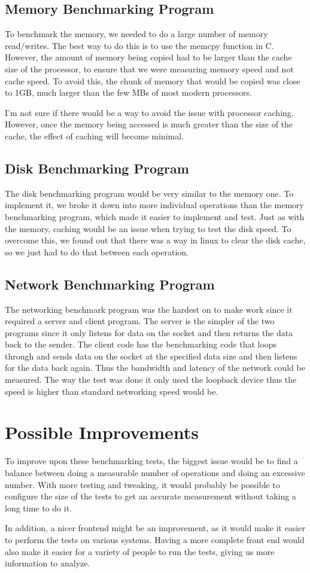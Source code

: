 \documentclass{article}
\begin{document}
\subsection{Memory Benchmarking Program}
To benchmark the memory, we needed to do a large number of memory read/writes.  The best way to do this is to use the memcpy function in C.  However, the amount of memory being copied had to be larger than the cache size of the processor, to ensure that we were measuring memory speed and not cache speed.  To avoid this, the chunk of memory that would be copied was close to 1GB, much larger than the few MBs of most modern processors.

I'm not sure if there would be a way to avoid the issue with processor caching.  However, once the memory being accessed is much greater than the size of the cache, the effect of caching will become minimal.

\subsection{Disk Benchmarking Program}
The disk benchmarking program would be very similar to the memory one.  To implement it, we broke it down into more individual operations than the memory benchmarking program, which made it easier to implement and test.  Just as with the memory, caching would be an issue when trying to test the disk speed.  To overcome this, we found out that there was a way in linux to clear the disk cache, so we just had to do that between each operation.

\subsection{Network Benchmarking Program}
The networking benchmark program was the hardest on to make work since it required a server and client program. The server is the simpler of the two programs since it only listens for data on the socket and then returns the data back to the sender. The client code has the benchmarking code that loops through and sends data on the socket at the specified data size and then listens for the data back again. Thus the bandwidth and latency of the network could be measured. The way the test was done it only used the loopback device thus the speed is higher than standard networking speed would be. 

\section{Possible Improvements}
To improve upon these benchmarking tests, the biggest issue would be to find a balance between doing a measurable number of operations and doing an excessive number.  With more testing and tweaking, it would probably be possible to configure the size of the tests to get an accurate measurement without taking a long time to do it.

In addition, a nicer frontend might be an improvement, as it would make it easier to perform the tests on various systems.  Having a more complete front end would also make it easier for a variety of people to run the tests, giving us more information to analyze.
\end{document}
